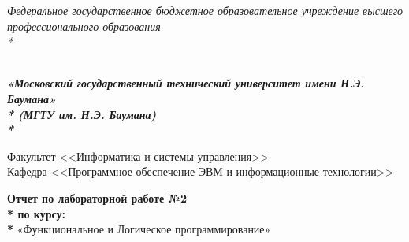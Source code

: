 \newpage
\begin{titlepage}
\thispagestyle{empty}

{\large
\begin{center}
	\textsl{Федеральное государственное бюджетное образовательное учреждение высшего профессионального образования \\* }	
	\vspace{2em}
\end{center}
}
{
\begin{minipage}[t]{0.13\textwidth}
  \centering{}
  \label{fig0}
  \end{minipage}\hfill
\begin{minipage}[t]{0.65\textwidth}
\begin{center}
\large  \textsl{\textbf {\\ «Московский государственный технический университет имени Н.Э. Баумана» \\* (МГТУ им. Н.Э. Баумана) \\* }}
  \end{center}
\end{minipage}
}

\vspace{2em}

\hrulefill

\begin{center}
 	\vspace{0pt plus2fill} %
	{\large
	Факультет  <<Информатика и системы управления>>\\
	Кафедра  <<Программное обеспечение ЭВМ и информационные технологии>>
	}
\end{center}

{\Large
\begin{center}
	\textbf{Отчет по лабораторной работе №2 \\* по курсу: \\* } «Функциональное и Логическое программирование» \\
\end{center}
}
%
\vspace{0pt plus4fill} %


\end{titlepage}
